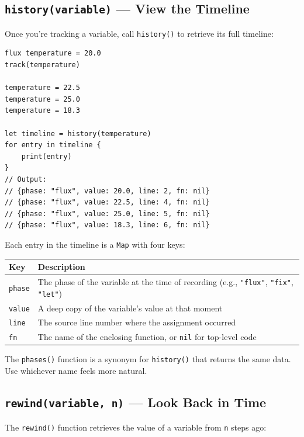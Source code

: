 \subsection{\texttt{history(variable)} --- View the Timeline}\label{sec:history}

Once you're tracking a variable, call \lstinline|history()| to retrieve its full timeline:

\begin{lstlisting}[language=Lattice, caption={Viewing variable history}]
flux temperature = 20.0
track(temperature)

temperature = 22.5
temperature = 25.0
temperature = 18.3

let timeline = history(temperature)
for entry in timeline {
    print(entry)
}
// Output:
// {phase: "flux", value: 20.0, line: 2, fn: nil}
// {phase: "flux", value: 22.5, line: 4, fn: nil}
// {phase: "flux", value: 25.0, line: 5, fn: nil}
// {phase: "flux", value: 18.3, line: 6, fn: nil}
\end{lstlisting}

Each entry in the timeline is a \lstinline|Map| with four keys:

\begin{longtable}{@{}lp{9cm}@{}}
\toprule
\textbf{Key} & \textbf{Description} \\
\midrule
\endhead
\lstinline|phase| & The phase of the variable at the time of recording (e.g., \lstinline|"flux"|, \lstinline|"fix"|, \lstinline|"let"|) \\
\lstinline|value| & A deep copy of the variable's value at that moment \\
\lstinline|line| & The source line number where the assignment occurred \\
\lstinline|fn| & The name of the enclosing function, or \lstinline|nil| for top-level code \\
\bottomrule
\end{longtable}

The \lstinline|phases()| function is a synonym for \lstinline|history()| that returns the same data. Use whichever name feels more natural.

\subsection{\texttt{rewind(variable, n)} --- Look Back in Time}\label{sec:rewind}

The \lstinline|rewind()| function retrieves the value of a variable from \lstinline|n| steps ago:

